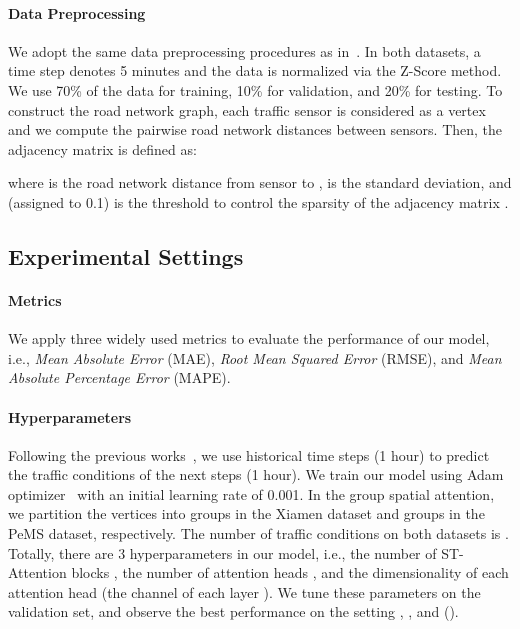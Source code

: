 \documentclass[letterpaper]{article} \usepackage{aaai20}  \usepackage{times}  \usepackage{helvet} \usepackage{courier}  \usepackage[hyphens]{url}  \usepackage{graphicx} \usepackage{amsmath}
\begin{document}
\paragraph{Data Preprocessing} 
We adopt the same data preprocessing procedures as in~\cite{Li-et-al:ICLR2018}. In both datasets, a time step denotes 5 minutes and the data is normalized via the Z-Score method. We use 70\% of the data for training, 10\% for validation, and 20\% for testing. To construct the road network graph, each traffic sensor is considered as a vertex and we compute the pairwise road network distances between sensors. Then, the adjacency matrix is defined as:

where  is the road network distance from sensor  to ,  is the standard deviation, and  (assigned to 0.1) is the threshold to control the sparsity of the adjacency matrix .

\subsection{Experimental Settings}

\paragraph{Metrics} 

We apply three widely used metrics to evaluate the performance of our model, i.e., \textit{Mean Absolute Error} (MAE), \textit{Root Mean Squared Error} (RMSE), and \textit{Mean Absolute Percentage Error} (MAPE).

\paragraph{Hyperparameters}

Following the previous works~\cite{Li-et-al:ICLR2018,Wu-et-al:IJCAI2019}, we use  historical time steps (1 hour) to predict the traffic conditions of the next  steps (1 hour). We train our model using Adam optimizer~\cite{Kingma-and-Ba:ICLR2015} with an initial learning rate of 0.001. In the group spatial attention, we partition the vertices into  groups in the Xiamen dataset and  groups in the PeMS dataset, respectively. The number of traffic conditions on both datasets is . Totally, there are 3 hyperparameters in our model, i.e., the number of ST-Attention blocks , the number of attention heads , and the dimensionality  of each attention head (the channel of each layer ). We tune these parameters on the validation set, and observe the best performance on the setting , , and  ().
\end{document}
